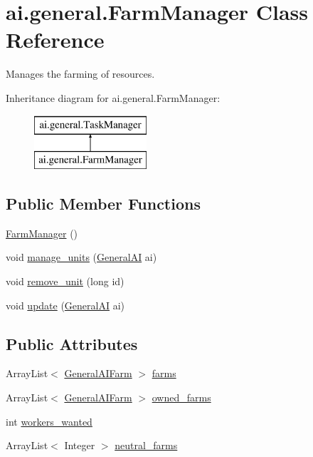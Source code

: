 \hypertarget{classai_1_1general_1_1_farm_manager}{
\section{ai.general.FarmManager Class Reference}
\label{classai_1_1general_1_1_farm_manager}
}


Manages the farming of resources.  


Inheritance diagram for ai.general.FarmManager:\begin{figure}[H]
\begin{center}
\leavevmode
\includegraphics[height=2.000000cm]{classai_1_1general_1_1_farm_manager}
\end{center}
\end{figure}
\subsection*{Public Member Functions}
\begin{DoxyCompactItemize}
\item 
\hyperlink{classai_1_1general_1_1_farm_manager_ae36453adb10b600dd638b7d1730b0763}{FarmManager} ()
\item 
void \hyperlink{classai_1_1general_1_1_farm_manager_aa40f9a63a3c10acf16633407f919ed37}{manage\_\-units} (\hyperlink{classai_1_1general_1_1_general_a_i}{GeneralAI} ai)
\item 
void \hyperlink{classai_1_1general_1_1_farm_manager_af548dce357940ca744e6024275a683d2}{remove\_\-unit} (long id)
\item 
void \hyperlink{classai_1_1general_1_1_farm_manager_a93d1a886ee93738fcb6bea2cc5c230ff}{update} (\hyperlink{classai_1_1general_1_1_general_a_i}{GeneralAI} ai)
\end{DoxyCompactItemize}
\subsection*{Public Attributes}
\begin{DoxyCompactItemize}
\item 
ArrayList$<$ \hyperlink{classai_1_1general_1_1_general_a_i_farm}{GeneralAIFarm} $>$ \hyperlink{classai_1_1general_1_1_farm_manager_a9bd738ced9a1940305e484ed9454f1c7}{farms}
\item 
ArrayList$<$ \hyperlink{classai_1_1general_1_1_general_a_i_farm}{GeneralAIFarm} $>$ \hyperlink{classai_1_1general_1_1_farm_manager_a4127471edad7fccfb34addaf6041da88}{owned\_\-farms}
\item 
int \hyperlink{classai_1_1general_1_1_farm_manager_aaf0202404f88cdfabebee5bc6d07753f}{workers\_\-wanted}
\item 
ArrayList$<$ Integer $>$ \hyperlink{classai_1_1general_1_1_farm_manager_a7fbfff2fdadbb3fbdeeeaeb62cd5496c}{neutral\_\-farms}
\end{DoxyCompactItemize}



